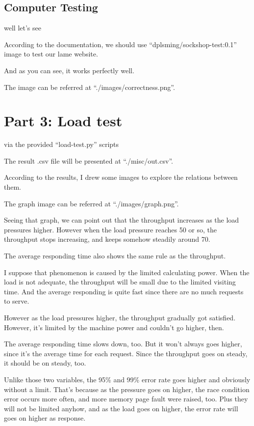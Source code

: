 \documentclass[11pt, oneside]{article}   	%
\begin{document}
\subsection{Computer Testing}
well let's see
\newline

According to the documentation, we should use ``dplsming/sockshop-test:0.1'' image to test our lame website.

And as you can see, it works perfectly well.

The image can be referred at ``./images/correctness.png''.

\section{Part 3: Load test}
via the provided ``load-test.py'' scripts
\newline

The result .csv file will be presented at ``./misc/out.csv''.

According to the results, I drew some images to explore the relations between them.

The graph image can be referred at ``./images/graph.png''.

Seeing that graph, we can point out that the throughput increases as the load pressures higher. However when the load pressure reaches 50 or so, the throughput stops increasing, and keeps somehow steadily around 70.

The average responding time also shows the same rule as the throughput.

I suppose that phenomenon is caused by the limited calculating power. When the load is not adequate, the throughput will be small due to the limited visiting time. And the average responding is quite fast since there are no much requests to serve.

However as the load pressures higher, the throughput gradually got satisfied. However, it's limited by the machine power and couldn't go higher, then.

The average responding time slows down, too. But it won't always goes higher, since it's the average time for each request. Since the throughput goes on steady, it should be on steady, too.

Unlike those two variables, the 95\% and 99\% error rate goes higher and obviously without a limit. That's because as the pressure goes on higher, the race condition error occurs more often, and more memory page fault were raised, too. Plus they will not be limited anyhow, and as the load goes on higher, the error rate will goes on higher as response.
\end{document}
